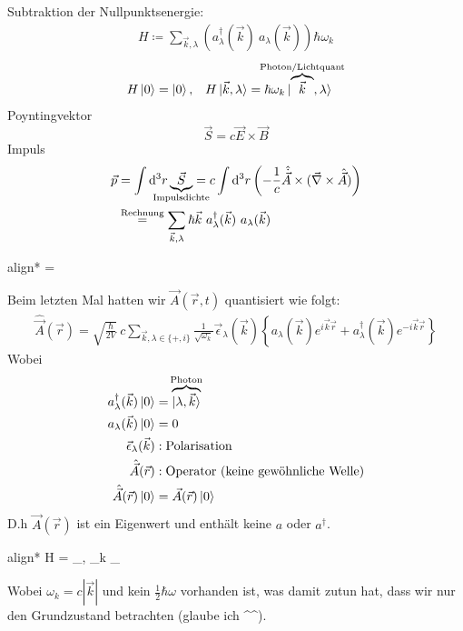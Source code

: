 	Subtraktion der Nullpunktsenergie:
		\begin{align*}
			\boxed{ 
				H \coloneqq 
				\sum_{\vec{k}, \lambda} \left( a^\dagger_\lambda (\vec{k}) ~a_\lambda (\vec{k})\right)
				\hbar \omega_k
			}
		\end{align*}
		\begin{align*}
			H \ket{0} &= \ket{0} ,& 
			H\ket{\vec{k}, \lambda} &= 
			\hbar \omega_k \ket{\overbrace{\vec{k}}^{\mathclap{\text{Photon/Lichtquant}}} , \lambda}
		\end{align*}
	Poyntingvektor
		\begin{equation*}
			\vec{S} = c \vec{E} \times \vec{B}
		\end{equation*}
	Impuls
		\begin{align*}
			\vec{p} &= \int \diff^3 r \underbrace{\vec{S}}_{\mathclap{\text{Impulsdichte}}} 
			= c \int \diff^3 r 
			\left( - \frac{1}{c} \hat{\dot{\vec{A}}} \times (\vec{\nabla} \times \hat{\vec{A}})
			\right) \\
			&\overset{\text{Rechnung}}{=} 
			\sum_{\vec{k} , \lambda} \hbar \vec{k} ~a^\dagger_\lambda (\vec{k}) ~a_\lambda (\vec{k})
		\end{align*}
		\begin{empheq}[box=\boxed]{align*}
			  = \hbar \vec{k} \ket{ , \lambda}
		\end{empheq}
		Beim letzten Mal hatten wir $\vec{A} (\vec{r}, t)$ quantisiert wie folgt:
		\begin{align*}
		\hat{\vec{A}} (\vec{r})= \sqrt{\frac{\hbar}{2V}} ~c
		\sum_{\vec{k}, \lambda \in \{+ , i\}}
		\frac{1}{\sqrt{\omega_k}} \vec{\epsilon}_\lambda (\vec{k}) 
		\left\{ a_\lambda (\vec{k}) e^{i \vec{k} \vec{r}}
		+ a^\dagger_\lambda (\vec{k}) e^{-i \vec{k} \vec{r}}
		\right\}
		\end{align*}
		Wobei
		\begin{align*}
		a^\dagger_\lambda (\vec{k}) \ket{0} 
		&= \overbrace{\ket{\lambda, \vec{k}}}^{\mathclap{\text{Photon}}} \\
		a_\lambda (\vec{k}) \ket{0} &= 0 \\
		\vec{\epsilon}_\lambda (\vec{k}) &: \text{Polarisation} \\
		\hat{\vec{A}} (\vec{r}) &: \text{Operator (keine gewöhnliche Welle)} \\
		\hat{\vec{A}} (\vec{r}) \ket{0} &= \vec{A} (\vec{r})\ket{0} 
		\end{align*}
		D.h $\vec{A} (\vec{r})$ ist ein Eigenwert und enthält keine $a$ oder $a^\dagger$.
		\begin{empheq}[box=\boxed]{align*}
		H = \sum_{, \lambda} \hbar \omega_k
		_{}
		\end{empheq}
		Wobei $\omega_k = c |\vec{k}|$ und kein $\frac{1}{2} \hbar \omega$ vorhanden ist, was damit zutun hat, dass wir nur den Grundzustand betrachten (glaube ich \^{}\^{}).
		

